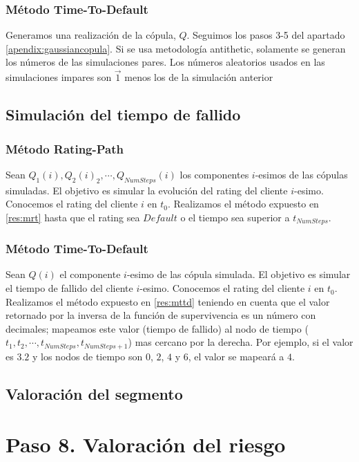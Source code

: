 \subsubsection{M\'etodo Time-To-Default}

Generamos una realizaci\'on de la c\'opula, $Q$.
Seguimos los pasos 3-5 del apartado \ref{apendix:gaussiancopula}.
\newline
\newline
Si se usa metodolog\'ia antithetic, solamente se generan los n\'umeros
de las simulaciones pares. Los n\'umeros aleatorios usados en las simulaciones
impares son $\vec{1}$ menos los de la simulaci\'on anterior 

\subsection{Simulaci\'on del tiempo de fallido}

\subsubsection{M\'etodo Rating-Path}

Sean $Q_1(i), Q_2(i)_2, \cdots, Q_{NumSteps}(i)$ los componentes $i$-esimos
de las c\'opulas simuladas. El objetivo es simular la evoluci\'on del
rating del cliente $i$-esimo. Conocemos el rating del cliente $i$
en $t_0$. Realizamos el m\'etodo expuesto en \ref{res:mrt} hasta que
el rating sea $Default$ o el tiempo sea superior a $t_{NumSteps}$.

\subsubsection{M\'etodo Time-To-Default}

Sean $Q(i)$ el componente $i$-esimo de las c\'opula simulada. El objetivo es
simular el tiempo de fallido del cliente $i$-esimo. Conocemos el rating del
cliente $i$ en $t_0$. Realizamos el m\'etodo expuesto en \ref{res:mttd} teniendo
en cuenta que el valor retornado por la inversa de la funci\'on de supervivencia
es un n\'umero con decimales; mapeamos este valor (tiempo de fallido) al
nodo de tiempo ($t_1, t_2, \cdots, t_{NumSteps}, t_{NumSteps+1}$) mas cercano
por la derecha. Por ejemplo, si el valor es $3.2$ y los nodos de tiempo son $0$,
$2$, $4$ y $6$, el valor se mapear\'a a $4$.

\subsection{Valoraci\'on del segmento}



\section{Paso 8. Valoraci\'on del riesgo}

